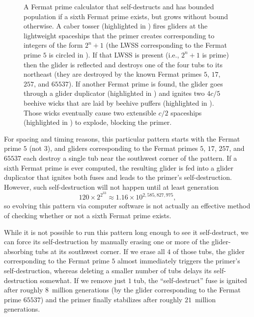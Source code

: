 \begin{figure}[!htbp]
	\centering
	\caption{A Fermat prime calculator that self-destructs and has bounded population if a sixth Fermat prime exists, but grows without bound otherwise. A caber tosser (highlighted in ) fires gliders at the lightweight spaceships that the primer creates corresponding to integers of the form $2^n+1$ (the LWSS corresponding to the Fermat prime $5$ is circled in ). If that LWSS is present (i.e., $2^n+1$ is prime) then the glider is reflected and destroys one of the four tubs to its northeast (they are destroyed by the known Fermat primes $5$, $17$, $257$, and $65537$). If another Fermat prime is found, the glider goes through a glider duplicator (highlighted in ) and ignites two $4c/5$ beehive wicks that are laid by beehive puffers (highlighted in ). Those wicks eventually cause two extensible $c/2$ spaceships (highlighted in ) to explode, blocking the primer.}\label{fig:fermat_primer}
\end{figure}

For spacing and timing reasons, this particular pattern starts with the Fermat prime $5$ (not $3$), and gliders corresponding to the Fermat primes $5$, $17$, $257$, and $65537$ each destroy a single tub near the southwest corner of the pattern. If a sixth Fermat prime is ever computed, the resulting glider is fed into a glider duplicator that ignites both fuses and leads to the primer's self-destruction. However, such self-destruction will not happen until at least generation
\[
	120 \times 2^{2^{33}} \approx 1.16 \times 10^{2,585,827,975},
\]
so evolving this pattern via computer software is  not actually an effective method of checking whether or not a sixth Fermat prime exists.

While it is not possible to run this pattern long enough to see it self-destruct, we can force its self-destruction by manually erasing one or more of the glider-absorbing tubs at its southwest corner. If we erase all $4$ of those tubs, the glider corresponding to the Fermat prime $5$ almost immediately triggers the primer's self-destruction, whereas deleting a smaller number of tubs delays its self-destruction somewhat. If we remove just $1$ tub, the ``self-destruct'' fuse is ignited after roughly $8$~million generations (by the glider corresponding to the Fermat prime $65537$) and the primer finally stabilizes after roughly $21$~million generations.


